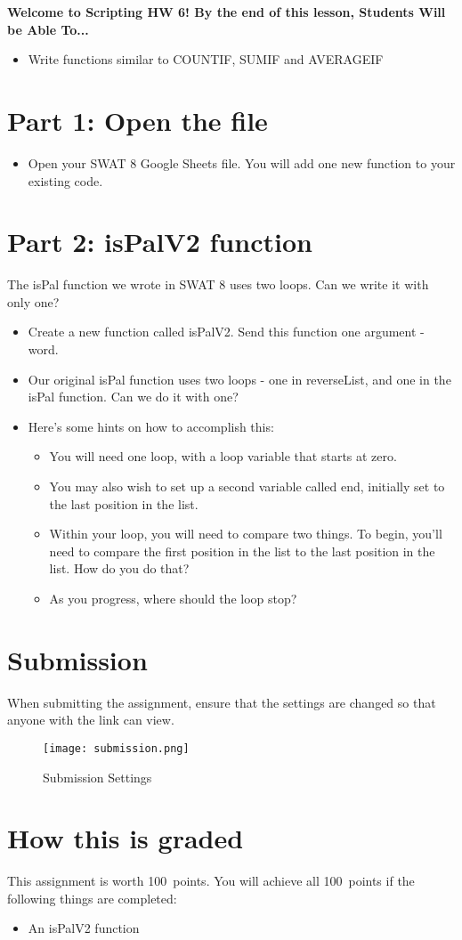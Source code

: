 \documentclass{article}
\newcommand{\AName}{Scripting HW 6}
\newcommand{\AValue}{100}
\begin{document}
\textbf{Welcome to \AName!  By the end of this lesson, Students Will be Able To...}
\begin{itemize}
    \item Write functions similar to COUNTIF, SUMIF and AVERAGEIF
\end{itemize}


\section*{Part 1: Open the file}
\begin{itemize}
    \item Open your SWAT 8 Google Sheets file.  You will add one new function to your existing code.
\end{itemize}

\section*{Part 2: isPalV2 function}
The isPal function we wrote in SWAT 8 uses two loops.  Can we write it with only one?
\begin{itemize}
    \item Create a new function called isPalV2.  Send this function one argument - word.
    \item Our original isPal function uses two loops - one in reverseList, and one in the isPal function.  Can we do it with one?
    \item Here's some hints on how to accomplish this:
    \begin{itemize}
    		\item You will need one loop, with a loop variable that starts at zero.
    		\item You may also wish to set up a second variable called end, initially set to the last position in the list.
    		\item Within your loop, you will need to compare two things.  To begin, you'll need to compare the first position in the list to the last position in the list.  How do you do that?
    		\item As you progress, where should the loop stop?
    	\end{itemize}
\end{itemize}

\section*{Submission}
When submitting the assignment, ensure that the settings are changed so that anyone with the link can view.
\begin{figure}[H]
  \centering
  \texttt{[image: submission.png]}
  \caption{Submission Settings}
\end{figure}

\section*{How this is graded}
This assignment is worth \AValue \ points. You will achieve all \AValue \   points if the following things are completed:
\begin{itemize}
    \item An isPalV2 function
\end{itemize}
\end{document}
